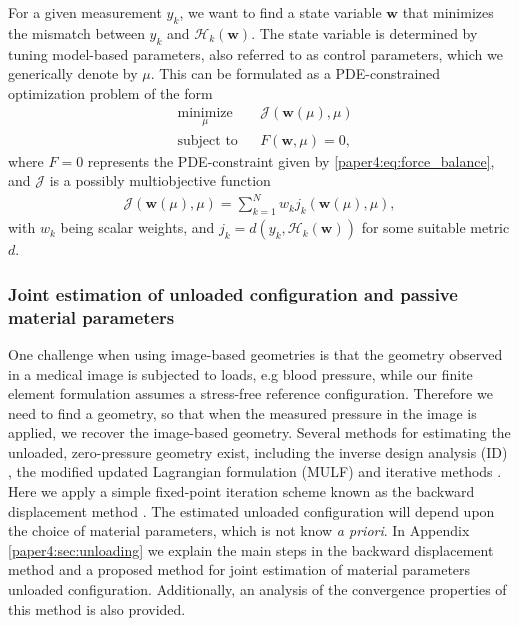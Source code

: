 For a given measurement $y_k$, we want to find a state variable
$\mathbf{w}$ that minimizes the mismatch between $y_k$ and
$\mathcal{H}_k(\mathbf{w})$. The state variable is determined by
tuning model-based parameters, also
referred to as control parameters, which we generically denote
by $\mu$. This can be formulated as a PDE-constrained optimization
problem of the form
\begin{equation}
  \begin{aligned}
    \label{paper4:eq:pde_opt}
    & \underset{\mu}{\text{minimize}}
    & &  \mathcal{J}(\mathbf{w}(\mu), \mu) \\
    & \text{subject to}
    & & F(\mathbf{w}, \mu)  = 0,
  \end{aligned}
\end{equation}
where $F=0$ represents the PDE-constraint given by
\eqref{paper4:eq:force_balance}, and $\mathcal{J}$ is a possibly
multiobjective function  
\begin{align}
  \mathcal{J}(\mathbf{w}(\mu), \mu) = \sum_{k = 1}^{N} w_k j_k (\mathbf{w}(\mu), \mu),
  \label{paper4:eq:cost_functional}
\end{align}
with $w_k$ being scalar weights, and $j_k = d( y_k,
  \mathcal{H}_k(\mathbf{w}) ) $ for some suitable metric $d$.



\subsubsection{Joint estimation of unloaded configuration and passive
  material parameters}
\label{paper4:sec:passive_param_estim}

One challenge when using image-based geometries is that the geometry
observed in a medical image is subjected to loads, e.g blood
pressure, while our finite element formulation assumes a stress-free
reference configuration. Therefore we need to find a geometry, so
that when the measured pressure in the image is applied, we recover
the image-based geometry. Several methods for estimating the unloaded,
zero-pressure geometry exist, including the inverse design analysis
(ID) \cite{govindjee1996computational}, the modified updated
Lagrangian formulation (MULF) \cite{gee2010computational} and
iterative methods \cite{bols2013computational,Rausch2017JB}.
Here we apply a simple fixed-point iteration scheme known as the backward
displacement method \cite{bols2013computational}.
The estimated unloaded configuration will depend upon the choice of material
parameters, which is not know  \emph{a priori}. In Appendix
\ref{paper4:sec:unloading} we explain the main steps in the backward
displacement method and a proposed method for joint estimation of material
parameters unloaded configuration. Additionally, an analysis of
the convergence properties of this method is also provided.


